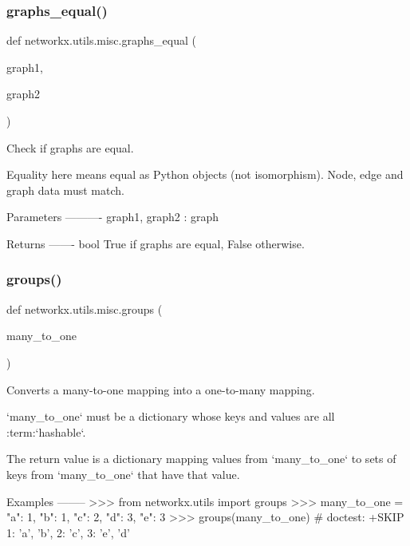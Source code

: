 \subsubsection{\texorpdfstring{graphs\+\_\+equal()}{graphs\_equal()}}
{\footnotesize\ttfamily def networkx.\+utils.\+misc.\+graphs\+\_\+equal (\begin{DoxyParamCaption}\item[{}]{graph1,  }\item[{}]{graph2 }\end{DoxyParamCaption})}

\begin{DoxyVerb}Check if graphs are equal.

Equality here means equal as Python objects (not isomorphism).
Node, edge and graph data must match.

Parameters
----------
graph1, graph2 : graph

Returns
-------
bool
    True if graphs are equal, False otherwise.
\end{DoxyVerb}
 \mbox{\label{namespacenetworkx_1_1utils_1_1misc_a3fd4c57079b5d0aa69046f653c93306a}} 
\subsubsection{\texorpdfstring{groups()}{groups()}}
{\footnotesize\ttfamily def networkx.\+utils.\+misc.\+groups (\begin{DoxyParamCaption}\item[{}]{many\+\_\+to\+\_\+one }\end{DoxyParamCaption})}

\begin{DoxyVerb}Converts a many-to-one mapping into a one-to-many mapping.

`many_to_one` must be a dictionary whose keys and values are all
:term:`hashable`.

The return value is a dictionary mapping values from `many_to_one`
to sets of keys from `many_to_one` that have that value.

Examples
--------
>>> from networkx.utils import groups
>>> many_to_one = {"a": 1, "b": 1, "c": 2, "d": 3, "e": 3}
>>> groups(many_to_one)  # doctest: +SKIP
{1: {'a', 'b'}, 2: {'c'}, 3: {'e', 'd'}}
\end{DoxyVerb}
 \mbox{\label{namespacenetworkx_1_1utils_1_1misc_ab3ea50d1f182fcd85380d859726024e5}} 

